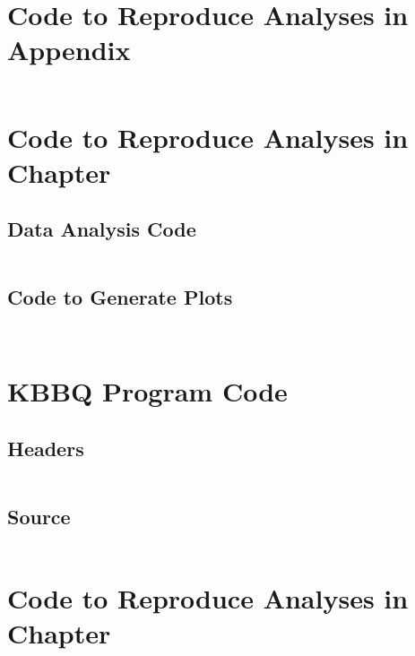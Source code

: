 
\chapter{Code to Reproduce Analyses in Appendix~\protect\structuredref{}}
\label{ch:structured_code}
\newpage
\inputminted[breaklines, breakanywhere, tabsize=2]{Makefile}{ch3/scripts/ch3_makefiles.txt}

\chapter{Code to Reproduce Analyses in Chapter~\protect\kbbqref{}}
\label{ch:kbbq_plot_code}
\newpage
\section{Data Analysis Code}
\inputminted[breaklines, breakanywhere, tabsize=2]{Makefile}{ch4/scripts/ch4_makefiles.txt}
\section{Code to Generate Plots}
\inputminted[breaklines, breakanywhere, tabsize=2]{r}{ch4/scripts/plot_benchmarks.R}
\inputminted[breaklines, breakanywhere, tabsize=2]{r}{defense/recalibration_explainer.R}

\chapter{KBBQ Program Code}
\label{ch:kbbq_code}
\newpage
\section{Headers}
\inputminted[breaklines, breakanywhere, tabsize=2]{cpp}{ch4/scripts/kbbq_include.hh}
\section{Source}
\inputminted[breaklines, breakanywhere, tabsize=2]{cpp}{ch4/scripts/kbbq_src.cc}

\chapter{Code to Reproduce Analyses in Chapter~\protect\evaluatingref{}}
\label{ch:evaluating_code}
\newpage
